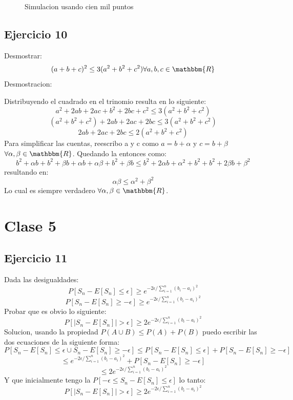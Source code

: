 \documentclass[12pt, a4paper]{article}
\begin{document}
\begin{figure}[H]
\begin{minipage}[b]{.3\linewidth}
		\label{fig:cien_mil_13}
	\end{minipage}
	\caption{Simulacion usando cien mil puntos}\label{fig:cien_mil}
\end{figure}

\subsection{Ejercicio 10}

Desmostrar:
		$$(a+b+c)^2 \leq 3(a^2+b^2+c^2) \forall a,b,c \in \mathbbm{R}$$
Desmostracion:

Distribuyendo el cuadrado en el trinomio resulta en lo siguiente:
		$$a^2+2ab+2ac+b^2+2bc+c^2 \leq 3(a^2+b^2+c^2)$$
		$$(a^2+b^2+c^2)+2ab+2ac+2bc \leq 3(a^2+b^2+c^2)$$
		$$2ab+2ac+2bc \leq 2(a^2+b^2+c^2)$$
Para simplificar las cuentas, reescribo a y c como $a = b+\alpha$ y $c = b+\beta$  $\forall \alpha, \beta \in \mathbbm{R}$. Quedando la entonces como:
		$$b^2+\alpha b+b^2+\beta b+\alpha b+\alpha \beta+b^2+\beta b \leq b^2+2\alpha b+\alpha^2+b^2+b^2+2\beta b+\beta^2$$
resultando en:
		$$\alpha \beta \leq \alpha^2+\beta^2$$
Lo cual es siempre verdadero $\forall \alpha,\beta \in \mathbbm{R}$.

\section{Clase 5}
\subsection{Ejercicio 11}
Dada las desigualdades:
		$$P[S_n - E[S_n] \leq \epsilon ] \geq e^{-2\epsilon/\sum\limits_{i=1}^{n}(b_i-a_i)^2}$$
		$$P[S_n - E[S_n] \geq -\epsilon ] \geq e^{-2\epsilon/\sum\limits_{i=1}^{n}(b_i-a_i)^2}$$
Probar que es obvio lo siguiente:
		$$P[|S_n - E[S_n]| > \epsilon ] \geq 2 e^{-2\epsilon/\sum\limits_{i=1}^{n}(b_i-a_i)^2}$$
Solucion, usando la propiedad $P(A\cup B) \leq P(A) + P(B)$ puedo escribir las dos ecuaciones de la siguiente forma:
		$$P[S_n - E[S_n] \leq \epsilon \cup S_n - E[S_n] \geq -\epsilon ] \leq P[S_n - E[S_n] \leq \epsilon ] + P[S_n - E[S_n] \geq -\epsilon ]$$
		$$\leq e^{-2\epsilon/\sum\limits_{i=1}^{n}(b_i-a_i)^2} + P[S_n - E[S_n] \geq -\epsilon ]$$
		$$\leq 2 e^{-2\epsilon/\sum\limits_{i=1}^{n}(b_i-a_i)^2}$$
Y que inicialmente tengo la $P[-\epsilon \leq S_n - E[S_n] \leq \epsilon ]$ lo tanto:
		$$P[|S_n - E[S_n]| > \epsilon ] \geq 2 e^{-2\epsilon/\sum\limits_{i=1}^{n}(b_i-a_i)^2}$$
\end{document}
